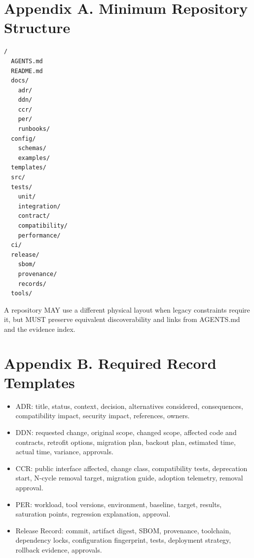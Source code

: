 \documentclass[11pt]{article}
\begin{document}
\hypertarget{sec-appendix-a}{}
\section*{Appendix A. Minimum Repository Structure}
\begin{verbatim}
/
  AGENTS.md
  README.md
  docs/
    adr/
    ddn/
    ccr/
    per/
    runbooks/
  config/
    schemas/
    examples/
  templates/
  src/
  tests/
    unit/
    integration/
    contract/
    compatibility/
    performance/
  ci/
  release/
    sbom/
    provenance/
    records/
  tools/
\end{verbatim}
A repository MAY use a different physical layout when legacy constraints require it, but MUST preserve equivalent discoverability and links from AGENTS.md and the evidence index.


\hypertarget{sec-appendix-b}{}
\section*{Appendix B. Required Record Templates}
\begin{itemize}
  \item ADR: title, status, context, decision, alternatives considered, consequences, compatibility impact, security impact, references, owners.
  \item DDN: requested change, original scope, changed scope, affected code and contracts, retrofit options, migration plan, backout plan, estimated time, actual time, variance, approvals.
  \item CCR: public interface affected, change class, compatibility tests, deprecation start, N-cycle removal target, migration guide, adoption telemetry, removal approval.
  \item PER: workload, tool versions, environment, baseline, target, results, saturation points, regression explanation, approval.
  \item Release Record: commit, artifact digest, SBOM, provenance, toolchain, dependency locks, configuration fingerprint, tests, deployment strategy, rollback evidence, approvals.
\end{itemize}

\hypertarget{sec-references}{}
\end{document}
